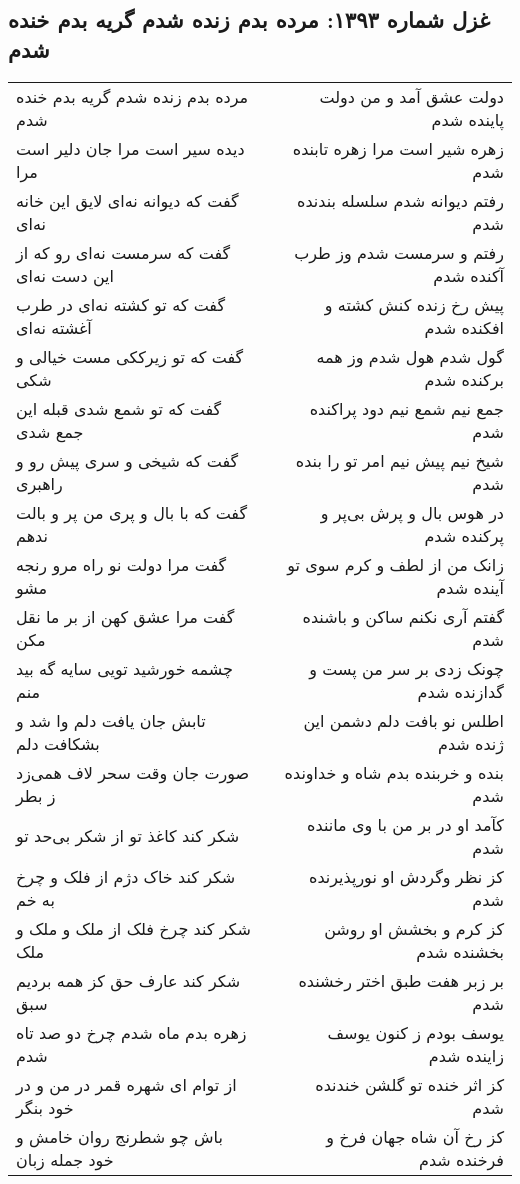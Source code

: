 \begin{center}
\section*{غزل شماره ۱۳۹۳: مرده بدم زنده شدم گریه بدم خنده شدم}
\label{sec:1393}
\begin{longtable}{l p{0.5cm} r}
مرده بدم زنده شدم گریه بدم خنده شدم
&&
دولت عشق آمد و من دولت پاینده شدم
\\
دیده سیر است مرا جان دلیر است مرا
&&
زهره شیر است مرا زهره تابنده شدم
\\
گفت که دیوانه نه‌ای لایق این خانه نه‌ای
&&
رفتم دیوانه شدم سلسله بندنده شدم
\\
گفت که سرمست نه‌ای رو که از این دست نه‌ای
&&
رفتم و سرمست شدم وز طرب آکنده شدم
\\
گفت که تو کشته نه‌ای در طرب آغشته نه‌ای
&&
پیش رخ زنده کنش کشته و افکنده شدم
\\
گفت که تو زیرککی مست خیالی و شکی
&&
گول شدم هول شدم وز همه برکنده شدم
\\
گفت که تو شمع شدی قبله این جمع شدی
&&
جمع نیم شمع نیم دود پراکنده شدم
\\
گفت که شیخی و سری پیش رو و راهبری
&&
شیخ نیم پیش نیم امر تو را بنده شدم
\\
گفت که با بال و پری من پر و بالت ندهم
&&
در هوس بال و پرش بی‌پر و پرکنده شدم
\\
گفت مرا دولت نو راه مرو رنجه مشو
&&
زانک من از لطف و کرم سوی تو آینده شدم
\\
گفت مرا عشق کهن از بر ما نقل مکن
&&
گفتم آری نکنم ساکن و باشنده شدم
\\
چشمه خورشید تویی سایه گه بید منم
&&
چونک زدی بر سر من پست و گدازنده شدم
\\
تابش جان یافت دلم وا شد و بشکافت دلم
&&
اطلس نو بافت دلم دشمن این ژنده شدم
\\
صورت جان وقت سحر لاف همی‌زد ز بطر
&&
بنده و خربنده بدم شاه و خداونده شدم
\\
شکر کند کاغذ تو از شکر بی‌حد تو
&&
کآمد او در بر من با وی ماننده شدم
\\
شکر کند خاک دژم از فلک و چرخ به خم
&&
کز نظر وگردش او نورپذیرنده شدم
\\
شکر کند چرخ فلک از ملک و ملک و ملک
&&
کز کرم و بخشش او روشن بخشنده شدم
\\
شکر کند عارف حق کز همه بردیم سبق
&&
بر زبر هفت طبق اختر رخشنده شدم
\\
زهره بدم ماه شدم چرخ دو صد تاه شدم
&&
یوسف بودم ز کنون یوسف زاینده شدم
\\
از توام ای شهره قمر در من و در خود بنگر
&&
کز اثر خنده تو گلشن خندنده شدم
\\
باش چو شطرنج روان خامش و خود جمله زبان
&&
کز رخ آن شاه جهان فرخ و فرخنده شدم
\\
\end{longtable}
\end{center}
